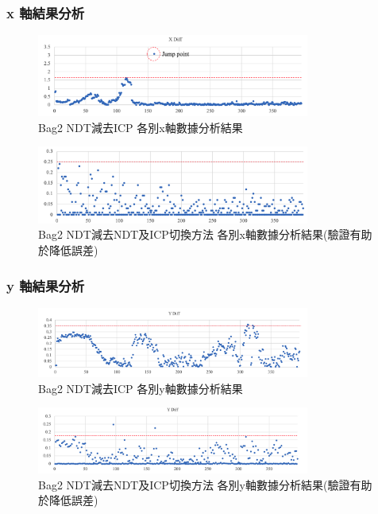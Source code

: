 \documentclass{article}
\begin{document}
\subsubsection{x 軸結果分析}
\begin{figure}[H]
\centering
	\includegraphics[width=0.8\textwidth]{./res2_x_icp.png}
	\caption{Bag2 NDT減去ICP 各別x軸數據分析結果}
\end{figure}

\begin{figure}[H]
\centering
	\includegraphics[width=0.8\textwidth]{./res2_x_icpndt.png}
	\caption{Bag2 NDT減去NDT及ICP切換方法 各別x軸數據分析結果(驗證有助於降低誤差)}
\end{figure}

\subsubsection{y 軸結果分析}

\begin{figure}[H]
\centering
	\includegraphics[width=0.8\textwidth]{./res2_y_icp.png}
	\caption{Bag2 NDT減去ICP 各別y軸數據分析結果}
\end{figure}

\begin{figure}[H]
\centering
	\includegraphics[width=0.8\textwidth]{./res2_y_icpndt.png}
	\caption{Bag2 NDT減去NDT及ICP切換方法 各別y軸數據分析結果(驗證有助於降低誤差)}
\end{figure}
\end{document}
